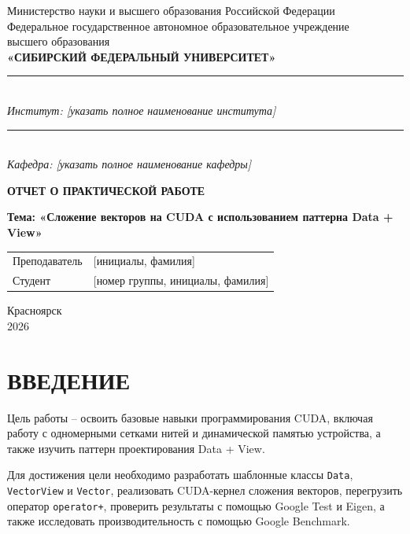 \documentclass[a4paper,14pt]{article}
\begin{document}
\begin{titlepage}
  \thispagestyle{empty}
  \begin{center}
    Министерство науки и высшего образования Российской Федерации\\
    Федеральное государственное автономное образовательное учреждение\\
    высшего образования\\
    \textbf{«СИБИРСКИЙ ФЕДЕРАЛЬНЫЙ УНИВЕРСИТЕТ»}\\[12mm]
    \rule{\textwidth}{0.4pt}\\[-2mm]
    \textit{Институт: [указать полное наименование института]}\\
    \rule{\textwidth}{0.4pt}\\[-2mm]
    \textit{Кафедра: [указать полное наименование кафедры]}

    \vfill
    \textbf{ОТЧЕТ О ПРАКТИЧЕСКОЙ РАБОТЕ}

    \vspace{8mm}
    \textbf{Тема: «Сложение векторов на CUDA с использованием паттерна Data + View»}

    \vfill
    \begin{flushright}
      \begin{tabular}{p{55mm}p{55mm}}
        Преподаватель & [инициалы, фамилия] \\
        Студент & [номер группы, инициалы, фамилия]
      \end{tabular}
    \end{flushright}

    \vfill
    Красноярск\\2026
  \end{center}
\end{titlepage}

\section*{ВВЕДЕНИЕ}
Цель работы -- освоить базовые навыки программирования CUDA, включая работу с одномерными сетками нитей и динамической памятью устройства, а также изучить паттерн проектирования Data + View.

Для достижения цели необходимо разработать шаблонные классы \texttt{Data}, \texttt{VectorView} и \texttt{Vector}, реализовать CUDA-кернел сложения векторов, перегрузить оператор \texttt{operator+}, проверить результаты с помощью Google Test и Eigen, а также исследовать производительность с помощью Google Benchmark.
\end{document}
